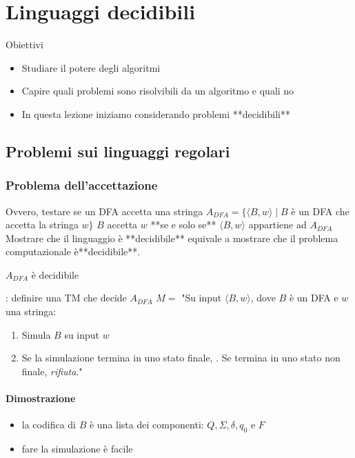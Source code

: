 \section{Linguaggi decidibili}
Obiettivi
\begin{itemize}
	\item Studiare il potere degli algoritmi
	\item Capire quali problemi sono risolvibili da un algoritmo e quali no
	\item In questa lezione iniziamo considerando problemi **decidibili** 
\end{itemize}

\subsection{Problemi sui linguaggi regolari}
\subsubsection{Problema dell'accettazione}
Ovvero, testare se un DFA accetta una stringa
$A_{DFA} = \{\langle B,w\rangle\mid B$  è un DFA che accetta la stringa $w\}$ 
$B$ accetta $w$ **se e solo se** $\langle B,w\rangle$ appartiene ad $A_{DFA}$ 
Mostrare che il linguaggio è **decidibile** equivale a mostrare che il problema computazionale è**decidibile**. 

\begin{theorem}{$A_{DFA}$ è decidibile}\end{theorem}
: definire una TM che decide $A_{DFA}$ 
$M=$ "Su input $\langle B,w\rangle$, dove $B$ è un DFA e $w$ una stringa: 
\begin{enumerate}
	\item Simula $B$ su input $w$ 
	\item Se la simulazione termina in uno stato finale, . Se termina in uno stato non finale, \textit{rifiuta}."
\end{enumerate}
	

\paragraph{Dimostrazione}
\begin{itemize}
	\item la codifica di $B$ è una lista dei componenti: $Q,\Sigma,\delta, q_0$ e $F$ 
	\item fare la simulazione è facile
\end{itemize}


